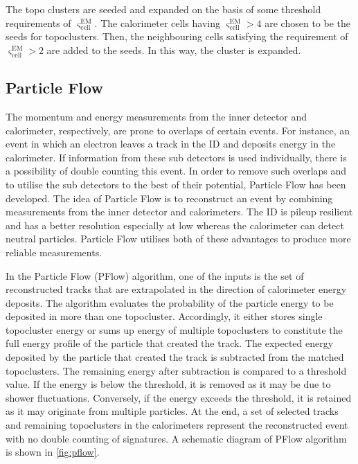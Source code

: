 The topo clusters are seeded and expanded on the basis of some threshold requirements of 
$\varsigma_{\text{cell}}^{\text{EM}}$. The calorimeter cells having 
$\varsigma_{\text{cell}}^{\text{EM}}>4$ are chosen to be the seeds for topoclusters. Then, the 
neighbouring cells satisfying the requirement of $\varsigma_{\text{cell}}^{\text{EM}}>2$ are added to 
the seeds. In this way, the cluster is expanded.

\subsection{Particle Flow}
\label{sec:pflow}
The momentum and energy measurements from the inner detector and calorimeter, respectively, are prone
to overlaps of certain events. For instance, an event in which an electron leaves a track in the ID and 
deposits energy in the calorimeter. If information from these sub detectors is used individually, there is a
possibility of double counting this event. In order to remove such overlaps and to utilise the sub detectors to
the best of their potential, Particle Flow has been developed. The idea of Particle Flow is to reconstruct an
event by combining measurements from the inner detector and calorimeters. The ID is pileup resilient and
has a better resolution especially at low \pT whereas the calorimeter can detect neutral particles. 
Particle Flow utilises both of these advantages to produce more reliable measurements.

In the Particle Flow (PFlow) algorithm, one of the inputs is the set of reconstructed tracks that are extrapolated
in the direction of calorimeter energy deposits. The algorithm evaluates the probability of the particle
energy to be deposited in more than one topocluster. Accordingly, it either stores single topocluster energy
or sums up energy of multiple topoclusters to constitute the full energy profile of the particle that created the
track. The expected energy deposited by the particle that created the track is subtracted from the matched
topoclusters. The remaining energy after subtraction is compared to a threshold value. If the energy is below the 
threshold, it is removed as it may be due to shower fluctuations. Conversely, if the energy exceeds the threshold, 
it is retained as it may originate from multiple particles. At the end, a set of selected tracks and remaining
topoclusters in the calorimeters represent the reconstructed event with no double counting of signatures. A schematic 
diagram of PFlow algorithm is shown in \cref{fig:pflow}.

